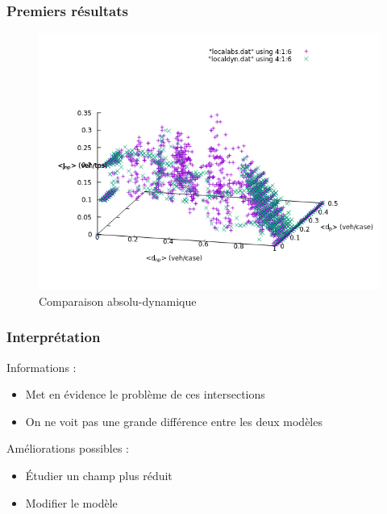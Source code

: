 \documentclass[slidetop,11pt]{beamer}
\begin{document}
\begin{frame}
	\frametitle{Premiers résultats}
	\begin{figure}
		\begin{center}
			\includegraphics[scale=0.4]{./diagrammes-fondamentaux/localabsdyn0w}
		\end{center}
	\caption{Comparaison absolu-dynamique}
	\end{figure}
\end{frame}

\begin{frame}
	\frametitle{Interprétation}
	Informations : 
		\begin{itemize}
			\item Met en évidence le problème de ces intersections
			\item On ne voit pas une grande différence entre les deux modèles		
		\end{itemize}
		
	Améliorations possibles :
		\begin{itemize}
			\item Étudier un champ plus réduit
			\item Modifier le modèle
		\end{itemize}

\end{frame}
\end{document}
